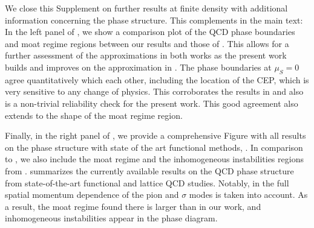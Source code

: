 \documentclass[reprint,twocolumn,superscriptaddress,preprintnumbers,amsmath,amssymb,aps,prd,floatfix]{revtex4-2}
\begin{document}
We close this Supplement on further results at finite density with additional information concerning the phase structure. This complements  in the main text: In the left panel of , we show a comparison plot of the QCD phase boundaries and moat regime regions between our results and those of \cite{Fu:2019hdw}. This allows for a further assessment of the approximations in both works as the present work builds and improves on the approximation in \cite{Fu:2019hdw}. The phase boundaries at $\mu_S=0$ agree quantitatively which each other, including the location of the CEP, which is very sensitive to any change of physics. This corroborates the results in \cite{Fu:2019hdw} and also is a non-trivial reliability check for the present work. This good agreement also extends to the shape of the moat regime region. 

Finally, in the right panel of , we provide a comprehensive Figure with all results on the phase structure with state of the art functional methods, \cite{Fu:2019hdw, Gao:2021wun, Gunkel:2021oya, Pawlowski:2025jpg}. In comparison to , we also include the moat regime and the inhomogeneous instabilities regions from \cite{Pawlowski:2025jpg}.  summarizes the currently available results on the QCD phase structure from state-of-the-art functional and lattice QCD studies. Notably, in \cite{Pawlowski:2025jpg} the full spatial momentum dependence of the pion and $\sigma$ modes is taken into account. As a result, the moat regime found there is larger than in our work, and inhomogeneous instabilities appear in the phase diagram. 





	
	
\end{document}
